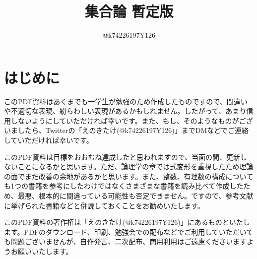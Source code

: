 \documentclass[10pt,a4paper,titlepage]{jsarticle}
\title{集合論 暫定版}
\author{@k74226197Y126}
\begin{document}
\maketitle
{}
\section*{はじめに}
このPDF資料はあくまでも一学生が勉強のため作成したものですので、間違いや不適切な表現、紛らわしい表現があるかもしれません。したがって、あまり信用しないようにしていただければ幸いです。また、もし、そのようなものがございましたら、Twitterの「えのきたけ(@k74226197Y126)」までDMなどでご連絡していただければ幸いです。\par
このPDF資料は目標をおおむね達成したと思われますので、当面の間、更新しないことになるかと思います。ただ、論理学の章では式変形を重視したため理論の面でまだ改善の余地があるかと思います。また、整数、有理数の構成についても1つの書籍を参考にしたわけではなくさまざまな書籍を読み比べて作成したため、最悪、根本的に間違っている可能性も否定できません。ですので、参考文献に挙げられた書籍などと併読しておくことをお勧めいたします。\par
このPDF資料の著作権は「えのきたけ(@k74226197Y126)」にあるものといたします。PDFのダウンロード、印刷、勉強会での配布などでご利用していただいても問題ございませんが、自作発言、二次配布、商用利用はご遠慮くださいますようお願いいたします。
\tableofcontents
\clearpage
{}


\clearpage


\clearpage

\clearpage

\clearpage

\clearpage

\clearpage

\clearpage

\clearpage

\clearpage

\clearpage


\clearpage

\clearpage

\end{document}
